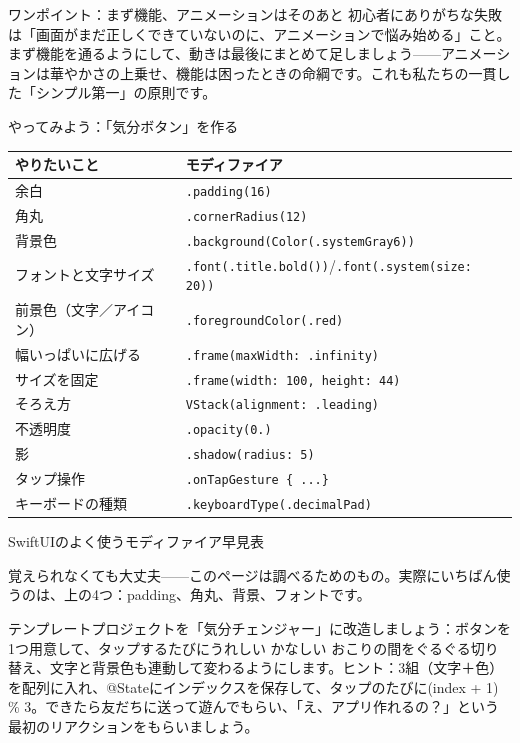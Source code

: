 \begin{tcbinfo}{ワンポイント：まず機能、アニメーションはそのあと}
初心者にありがちな失敗は「画面がまだ正しくできていないのに、アニメーションで悩み始める」こと。まず機能を通るようにして、動きは最後にまとめて足しましょう——アニメーションは華やかさの上乗せ、機能は困ったときの命綱です。これも私たちの一貫した「シンプル第一」の原則です。

\end{tcbinfo}

\begin{tcbpractice}{やってみよう：「気分ボタン」を作る}

\begin{center}
\begin{tabularx}{\linewidth}{|X|X|}
\hline
\textbf{やりたいこと} & \textbf{モディファイア} \tabularnewline
\hline
余白 & \texttt{.\allowbreak padding(16)} \tabularnewline
角丸 & \texttt{.\allowbreak cornerRadius(12)} \tabularnewline
背景色 & \texttt{.\allowbreak background(Color(.\allowbreak systemGray6))} \tabularnewline
フォントと文字サイズ & \texttt{.\allowbreak font(.\allowbreak title.\allowbreak bold())}/\texttt{.\allowbreak font(.\allowbreak system(size: 20))} \tabularnewline
前景色（文字／アイコン） & \texttt{.\allowbreak foregroundColor(.\allowbreak red)} \tabularnewline
幅いっぱいに広げる & \texttt{.\allowbreak frame(maxWidth: .\allowbreak infinity)} \tabularnewline
サイズを固定 & \texttt{.\allowbreak frame(width: 100, height: 44)} \tabularnewline
そろえ方 & \texttt{VStack(alignment: .\allowbreak leading)} \tabularnewline
不透明度 & \texttt{.\allowbreak opacity(0.\allowbreak 6)} \tabularnewline
影 & \texttt{.\allowbreak shadow(radius: 5)} \tabularnewline
タップ操作 & \texttt{.\allowbreak onTapGesture \{ .\allowbreak .\allowbreak .\allowbreak  \}} \tabularnewline
キーボードの種類 & \texttt{.\allowbreak keyboardType(.\allowbreak decimalPad)} \tabularnewline
\hline
\end{tabularx}
\end{center}

\begin{center}\small\color{gray}SwiftUIのよく使うモディファイア早見表\end{center}

覚えられなくても大丈夫——このページは調べるためのもの。実際にいちばん使うのは、上の4つ：padding、角丸、背景、フォントです。

テンプレートプロジェクトを「気分チェンジャー」に改造しましょう：ボタンを1つ用意して、タップするたびにうれしい かなしい おこりの間をぐるぐる切り替え、文字と背景色も連動して変わるようにします。ヒント：3組（文字＋色）を配列に入れ、@Stateにインデックスを保存して、タップのたびに(index + 1) \% 3。できたら友だちに送って遊んでもらい、「え、アプリ作れるの？」という最初のリアクションをもらいましょう。

\end{tcbpractice}

